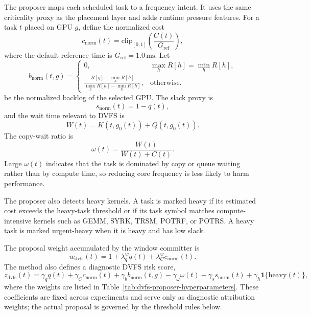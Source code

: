 The proposer maps each scheduled task to a frequency intent. It uses the same criticality proxy as the placement layer and adds runtime pressure features. For a task $t$ placed on GPU $g$, define the normalized cost
\begin{equation}
c_{\mathrm{norm}}(t)=\mathrm{clip}_{[0,1]}\left(\frac{C(t)}{G_{\mathrm{ref}}}\right),
\end{equation}
where the default reference time is $G_{\mathrm{ref}}=1.0\,\mathrm{ms}$. Let
\begin{equation}
b_{\mathrm{norm}}(t,g)
=
\left\{
\begin{array}{ll}
0, & \max_h R[h]=\min_h R[h],\\[4pt]
\displaystyle\frac{R[g]-\min_h R[h]}{\max_h R[h]-\min_h R[h]}, & \mathrm{otherwise}.
\end{array}
\right.
\end{equation}
be the normalized backlog of the selected GPU. The slack proxy is
\begin{equation}
s_{\mathrm{norm}}(t)=1-q(t),
\end{equation}
and the wait time relevant to DVFS is
\begin{equation}
W(t)=K(t,g_0(t))+Q(t,g_0(t)).
\end{equation}
The copy-wait ratio is
\begin{equation}
\omega(t)=\frac{W(t)}{W(t)+C(t)}.
\end{equation}
Large $\omega(t)$ indicates that the task is dominated by copy or queue waiting rather than by compute time, so reducing core frequency is less likely to harm performance.

The proposer also detects heavy kernels. A task is marked heavy if its estimated cost exceeds the heavy-task threshold or if its task symbol matches compute-intensive kernels such as GEMM, SYRK, TRSM, POTRF, or POTRS. A heavy task is marked urgent-heavy when it is heavy and has low slack.

The proposal weight accumulated by the window committer is
\begin{equation}
w_{\mathrm{dvfs}}(t)
=
1+\lambda_q^{w}q(t)+\lambda_C^{w}c_{\mathrm{norm}}(t).
\end{equation}
The method also defines a diagnostic DVFS risk score,
\begin{equation}
z_{\mathrm{dvfs}}(t)
=
\gamma_q q(t)
+\gamma_C c_{\mathrm{norm}}(t)
+\gamma_b b_{\mathrm{norm}}(t,g)
-\gamma_{\omega}\omega(t)
-\gamma_s s_{\mathrm{norm}}(t)
+\gamma_h\mathbf{1}\{\mathrm{heavy}(t)\},
\end{equation}
where the weights are listed in Table~\ref{tab:dvfs-proposer-hyperparameters}. These coefficients are fixed across experiments and serve only as diagnostic attribution weights; the actual proposal is governed by the threshold rules below.

